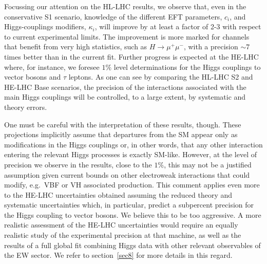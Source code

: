 Focussing our attention on the HL-LHC results, we observe that, even in the conservative S1 scenario, knowledge of the different EFT parameters, $c_i$, and Higgs-couplings modifiers, $\kappa_i$, will improve by at least a factor of 2-3 with respect to current experimental limits. The improvement is more marked for channels that benefit from very high statistics, such as $H\to \mu^+ \mu^-$, with a precision $\sim 7$ times better than in the current fit. Further progress is expected at the HE-LHC where, for instance, we foresee
$1\%$ level determinations for the Higgs couplings to vector bosons and $\tau$ leptons.
As one can see by comparing the HL-LHC S2 and HE-LHC Base scenarios, the precision of the interactions associated with the main Higgs couplings 
will be controlled, to a large extent, by systematic and theory errors. 

One must be careful with the interpretation of these results, though. These projections implicitly assume that departures from the SM appear only as modifications in the Higgs couplings or, in other words, that any other interaction entering the relevant Higgs processes is exactly SM-like. However, at the level of precision we observe in the results, close to the $1\%$, this may not be a justified assumption given current bounds on other electroweak interactions that could modify, e.g.~VBF or VH associated production. This comment applies even more to the HE-LHC uncertainties obtained assuming the reduced theory and systematic uncertainties which, in particular, predict a subpercent precision for the Higgs coupling to vector bosons. We believe this to be too aggressive. A more realistic assessment of the HE-LHC uncertainties would require an equally realistic study of the experimental precision at that machine, as well as the results of a full global fit combining Higgs data with other relevant observables of the EW sector. We refer to section~\ref{sec8} for more details in this regard.

